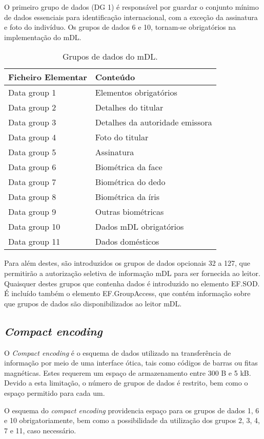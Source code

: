 O primeiro grupo de dados (DG 1) é responsável por guardar o conjunto mínimo de dados essenciais para identificação internacional, com a exceção da assinatura e foto do indivíduo. Os grupos de dados 6 e 10, tornam-se obrigatórios na implementação do mDL. 

\begin{table}[H]
\centering
\caption{Grupos de dados do mDL.}
\label{table:grupos_dados}
\vspace{0.2cm}
\begin{tabular}{|l|l|}
\hline
\rowcolor[HTML]{EFEFEF}
Ficheiro Elementar & Conteúdo \\ \hline
Data group 1 & Elementos obrigatórios \\ \hline
Data group 2 & Detalhes do titular \\ \hline
Data group 3 & Detalhes da autoridade emissora \\ \hline
Data group 4 & Foto do titular \\ \hline
Data group 5 & Assinatura \\ \hline
Data group 6 & Biométrica da face \\ \hline
Data group 7 & Biométrica do dedo \\ \hline
Data group 8 & Biométrica da íris \\ \hline
Data group 9 & Outras biométricas \\ \hline
Data group 10 & Dados mDL obrigatórios \\ \hline
Data group 11 & Dados domésticos \\ \hline
\end{tabular}
\end{table}

Para além destes, são introduzidos os grupos de dados opcionais 32 a 127, que permitirão a autorização seletiva de informação mDL para ser fornecida ao leitor. Quaisquer destes grupos que contenha dados é introduzido no elemento EF.SOD. É incluído também o elemento EF.GroupAccess, que contém informação sobre que grupos de dados são disponibilizados ao leitor mDL.

\subsection{\textit{Compact encoding}}

O \textit{Compact encoding} é o esquema de dados utilizado na transferência de informação por meio de uma interface ótica, tais como códigos de barras ou fitas magnéticas. Estes requerem um espaço de armazenamento entre 300 B e 5 kB. Devido a esta limitação, o número de grupos de dados é restrito, bem como o espaço permitido para cada um.

O esquema do \textit{compact encoding} providencia espaço para os grupos de dados 1, 6 e 10 obrigatoriamente, bem como a possibilidade da utilização dos grupos 2, 3, 4, 7 e 11, caso necessário.
